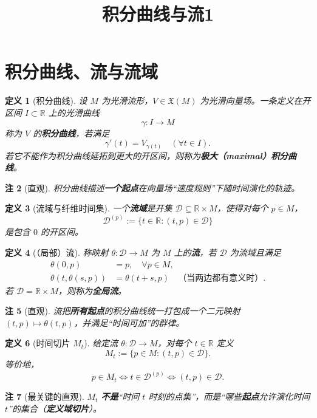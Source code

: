 \documentclass[11pt]{article}
\title{积分曲线与流1}
\author{}
\date{}
\newtheorem{definition}{定义}[section]
\newtheorem{remark}[definition]{注}
\newcommand{\R}{\mathbb{R}}
\newcommand{\D}{\mathcal{D}}
\newcommand{\X}{\mathfrak{X}}
\begin{document}
\maketitle
\tableofcontents

\section{积分曲线、流与流域}

\begin{definition}[积分曲线]
设 $M$ 为光滑流形，$V\in\X(M)$ 为光滑向量场。一条定义在开区间 $I\subset\R$ 上的光滑曲线
\[
\gamma:I\to M
\]
称为 $V$ 的\textbf{积分曲线}，若满足
\[
\gamma'(t)=V_{\gamma(t)}\quad(\forall t\in I).
\]
若它不能作为积分曲线延拓到更大的开区间，则称为\textbf{极大（maximal）积分曲线}。
\end{definition}

\begin{remark}[直观]
积分曲线描述\textbf{一个起点}在向量场“速度规则”下随时间演化的轨迹。
\end{remark}

\begin{definition}[流域与纤维时间集]
一个\textbf{流域}是开集 $\D\subseteq \R\times M$，使得对每个 $p\in M$，
\[
\D^{(p)}:=\{t\in\R:(t,p)\in\D\}
\]
是包含 $0$ 的开区间。
\end{definition}

\begin{definition}[（局部）流]
称映射 $\theta:\D\to M$ 为 $M$ 上的\textbf{流}，若 $\D$ 为流域且满足
\begin{align}
\theta(0,p)&=p,\quad \forall p\in M, \tag{9.6}\\
\theta(t,\theta(s,p))&=\theta(t+s,p)\quad \text{（当两边都有意义时）}. \tag{9.7}
\end{align}
若 $\D=\R\times M$，则称为\textbf{全局流}。
\end{definition}

\begin{remark}[直观]
流把\textbf{所有起点}的积分曲线统一打包成一个二元映射 $(t,p)\mapsto \theta(t,p)$，并满足“时间可加”的群律。
\end{remark}

\begin{definition}[时间切片 $M_t$]
给定流 $\theta:\D\to M$，对每个 $t\in\R$ 定义
\[
M_t:=\{p\in M:(t,p)\in\D\}. \tag{9.8}
\]
等价地，
\[
p\in M_t \iff t\in \D^{(p)} \iff (t,p)\in\D.
\]
\end{definition}

\begin{remark}[最关键的直观]
$M_t$ \textbf{不是}“时间 $t$ 时刻的点集”，而是“哪些\textbf{起点}允许演化时间 $t$”的集合（\textbf{定义域切片}）。
\end{remark}
\end{document}
